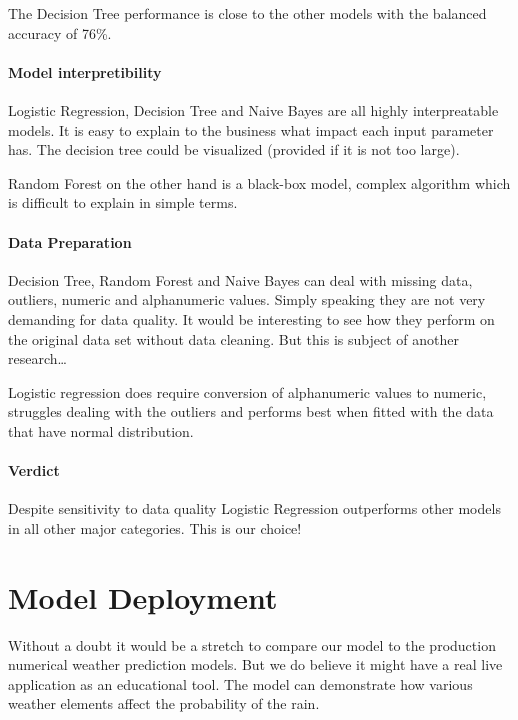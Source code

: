 The Decision Tree performance is close to the other models with the
balanced accuracy of 76\%.

\hypertarget{model-interpretibility}{%
\paragraph{Model interpretibility}\label{model-interpretibility}}

Logistic Regression, Decision Tree and Naive Bayes are all highly
interpreatable models. It is easy to explain to the business what impact
each input parameter has. The decision tree could be visualized
(provided if it is not too large).

Random Forest on the other hand is a black-box model, complex algorithm
which is difficult to explain in simple terms.

\hypertarget{data-preparation-1}{%
\paragraph{Data Preparation}\label{data-preparation-1}}

Decision Tree, Random Forest and Naive Bayes can deal with missing data,
outliers, numeric and alphanumeric values. Simply speaking they are not
very demanding for data quality. It would be interesting to see how they
perform on the original data set without data cleaning. But this is
subject of another research\ldots{}

Logistic regression does require conversion of alphanumeric values to
numeric, struggles dealing with the outliers and performs best when
fitted with the data that have normal distribution.

\hypertarget{verdict}{%
\paragraph{Verdict}\label{verdict}}

Despite sensitivity to data quality Logistic Regression outperforms
other models in all other major categories. This is our choice!

\hypertarget{model-deployment}{%
\section{Model Deployment}\label{model-deployment}}

Without a doubt it would be a stretch to compare our model to the
production numerical weather prediction models. But we do believe it
might have a real live application as an educational tool. The model can
demonstrate how various weather elements affect the probability of the
rain.

